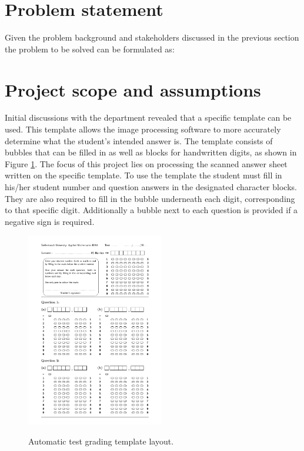\section{Problem statement}
\label{sec:problemStatement}

Given the problem background and stakeholders discussed in the previous section the problem to be solved can be formulated as:
\newline
\newline
\noindent{}

\section{Project scope and assumptions}\label{sec:Scope}
Initial discussions with the department revealed that a specific template can be used. This template allows the image processing software to more accurately determine what the student's intended answer is. The template consists of bubbles that can be filled in as well as blocks for handwritten digits, as shown in Figure \ref{fig:NumbersTemplate}. The focus of this project lies on processing the scanned answer sheet written on the specific template. To use the template the student must fill in his/her student number and question answers in the designated character blocks. They are also required to fill in the bubble underneath each digit, corresponding to that specific digit. Additionally a bubble next to each question is provided if a negative sign is required.

\begin{figure}
  \centering
  \includegraphics[width=6cm]{NumbersTemplate}\\
  \caption{Automatic test grading template layout.}
  \label{fig:NumbersTemplate}
\end{figure}


